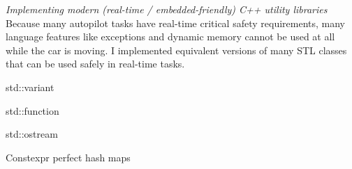 \documentclass[margin,line]{resume}
\begin{document}
\begin{resume}
    \textsl{Implementing modern (real-time / embedded-friendly) C++ utility libraries} \\
    Because many autopilot tasks have real-time critical safety requirements, many language features like exceptions
    and dynamic memory cannot be used at all while the car is moving. I implemented equivalent versions of many STL
    classes that can be used safely in real-time tasks.
    \begin{list2}
    \item \textrm{std::variant}
    \item \textrm{std::function}
    \item \textrm{std::ostream}
    \item Constexpr perfect hash maps
    \end{list2}

\newpage

    


\end{resume}
\end{document}
